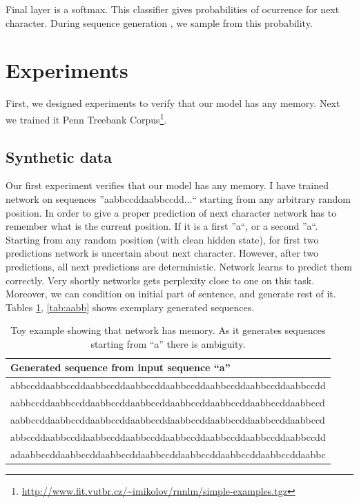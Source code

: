 \documentclass{article}
\begin{document}
Final layer is a softmax. This classifier gives probabilities of ocurrence for next character. During sequence generation
, we sample from this probability. 


\section{Experiments}\label{sec:experiments}
First, we designed experiments to verify that our model has any memory. 
Next we trained it Penn Treebank Corpus\footnote{\url{http://www.fit.vutbr.cz/~imikolov/rnnlm/simple-examples.tgz}}.  


\subsection{Synthetic data}
Our first experiment verifies that our model has any memory. I have trained network on sequences ''aabbccddaabbccdd$\dots$`` starting
from any arbitrary random position. In order to give a proper prediction of next character network has to remember what
is the current position. If it is a first ''a``, or a second ''a``. Starting from any random position (with clean hidden state), for first two predictions
network is uncertain about next character. However, after two predictions, all next predictions are deterministic. Network
learns to predict them correctly. Very shortly networks gets perplexity close to one on this task. Moreover, we can condition
on initial part of sentence, and generate rest of it. Tables \ref{tab:a}, \ref{tab:aabb} shows exemplary generated sequences.


\begin{table}[t]
\tiny
\centering
\begin{tabular}{l}
\hline
Generated sequence from input sequence ``a'' \\
\hline
 abbccddaabbccddaabbccddaabbccddaabbccddaabbccddaabbccddaabbccdd\\
 aabbccddaabbccddaabbccddaabbccddaabbccddaabbccddaabbccddaabbccd\\
 aabbccddaabbccddaabbccddaabbccddaabbccddaabbccddaabbccddaabbccd\\
 abbccddaabbccddaabbccddaabbccddaabbccddaabbccddaabbccddaabbccdd\\
 adaabbccddaabbccddaabbccddaabbccddaabbccddaabbccddaabbccddaabbc\\
\hline
\end{tabular}
\caption{Toy example showing that network has memory. As it generates sequences starting from ``a'' there is 
        ambiguity.}
        \label{tab:a}
\end{table}
\end{document}
